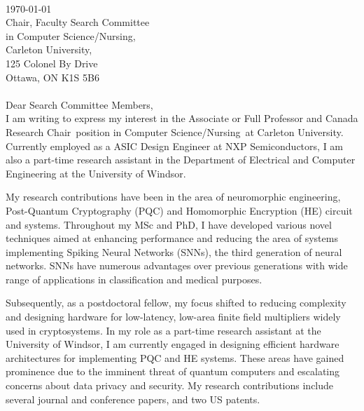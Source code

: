 \documentclass[12pt,oneside]{book}
\newcommand{\position}{Associate or Full Professor and Canada Research Chair}
\newcommand{\department}{in  Computer Science/Nursing}
\newcommand{\university}{Carleton University}
\begin{document}
\thispagestyle{empty}
\vspace*{-5em} \phantom \quad \\
\today\\
Chair, Faculty Search Committee\\
\department ,\\
\university ,\\
125 Colonel By Drive \\
Ottawa, ON K1S 5B6\
\phantom \quad \\ \\
Dear Search Committee Members,\\

I am writing to express my interest in  the \position ~position   \department ~at \university . Currently employed as a ASIC Design Engineer at NXP Semiconductors, I am also a part-time research assistant in the Department of Electrical and Computer Engineering at the University of Windsor.

My research contributions have been in the area of neuromorphic engineering, Post-Quantum Cryptography (PQC) and Homomorphic Encryption (HE) circuit and systems.  
Throughout my MSc and PhD, I  have developed various novel techniques aimed at enhancing performance and reducing the area of systems implementing Spiking Neural Networks (SNNs), the third generation of neural networks. SNNs have numerous advantages over previous generations with wide range of applications  in classification and medical purposes.   


Subsequently, as a postdoctoral fellow, my focus shifted to reducing complexity and designing hardware for low-latency, low-area finite field multipliers widely used in cryptosystems.
In my role as a part-time research assistant at the University of Windsor, I am currently engaged in designing efficient hardware architectures for implementing PQC and HE systems. These areas have gained prominence due to the imminent threat of quantum computers and escalating concerns about data privacy and security.  My research contributions include several journal and conference papers, and two US patents. 
\end{document}
